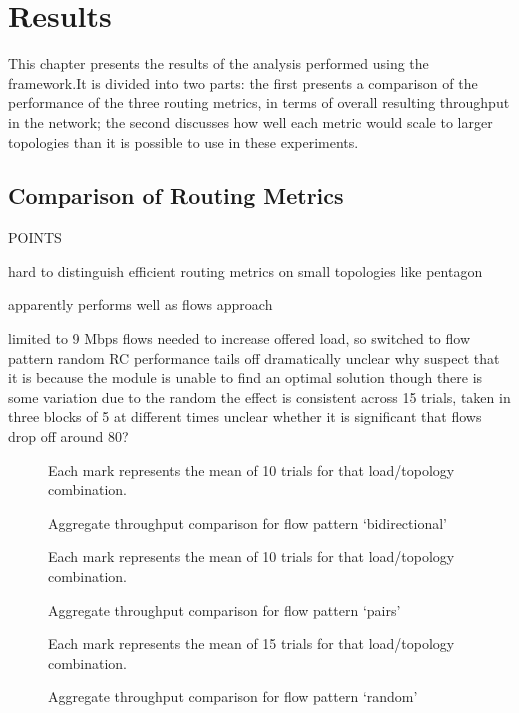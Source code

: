 \chapter{Results}

This chapter presents the results of the analysis performed using the framework.It is divided into two parts: the first presents a comparison of the performance of the three routing metrics, in terms of overall resulting throughput in the network; the second discusses how well each metric would scale to larger topologies than it is possible to use in these experiments.

\section{Comparison of Routing Metrics}
POINTS

hard to distinguish efficient routing metrics on small topologies like pentagon

apparently performs well as flows approach 

limited to 9 Mbps flows
needed to increase offered load, so switched to flow pattern random
RC performance tails off dramatically
unclear why
suspect that it is because the module is unable to find an optimal solution
though there is some variation due to the random the effect is consistent across 15 trials, taken in three blocks of 5 at different times
unclear whether it is significant that flows drop off around 80?


\begin{landscape}
\begin{figure}
\centering

\caption{Aggregate throughput comparison for flow pattern `bidirectional'}
Each mark represents the mean of 10 trials for that load/topology combination.
\label{fig:pairs}
\end{figure}

\begin{figure}
\centering

\caption{Aggregate throughput comparison for flow pattern `pairs'}
\label{fig:pairs}
Each mark represents the mean of 10 trials for that load/topology combination.
\end{figure}

\begin{figure}
\centering

\caption{Aggregate throughput comparison for flow pattern `random'}
Each mark represents the mean of 15 trials for that load/topology combination.
\label{fig:random}
\end{figure}
\end{landscape}

